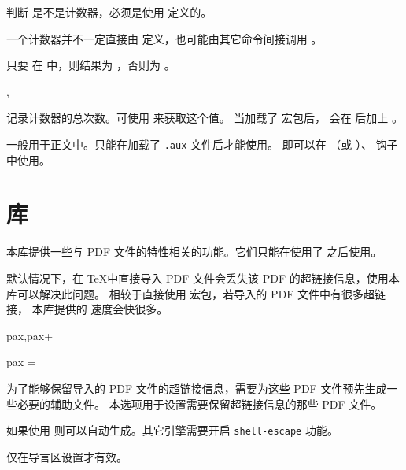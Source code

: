 \documentclass{cusdoc}
\begin{document}
\begin{function}{\IfIsCounterTF}
  \begin{syntax}
    \V\IfIsCounterTF {}  
  \end{syntax}
判断  是不是计数器，必须是使用  定义的。

\begin{texnote}
一个计数器并不一定直接由  定义，也可能由其它命令间接调用 。

只要  在  中，则结果为 ，否则为 。
\end{texnote}
\end{function}

\begin{function}{\RecordTotalCounters,\IfRecordTotalCounterTF}
  \begin{syntax}
    \V\RecordTotalCounters {}
    \V\IfRecordTotalCounterTF {}  
  \end{syntax}
记录计数器的总次数。可使用  来获取这个值。
当加载了  宏包后， 会在  后加上 。

 一般用于正文中。只能在加载了 \texttt{.aux} 文件后才能使用。
即可以在 （或 ）、 钩子中使用。
\end{function}


\section{库}

本库提供一些与 PDF 文件的特性相关的功能。它们只能在使用了 
 之后使用。

默认情况下，在 \TeX 中直接导入 PDF 文件会丢失该 PDF 的超链接信息，使用本库可以解决此问题。
相较于直接使用  宏包，若导入的 PDF 文件中有很多超链接，
本库提供的  速度会快很多。

\begin{keyval}[path=pdf]{pax,pax+}
  \begin{syntax}
    pax = 
  \end{syntax}
为了能够保留导入的 PDF 文件的超链接信息，需要为这些 PDF 文件预先生成一些必要的辅助文件。
本选项用于设置需要保留超链接信息的那些 PDF 文件。

如果使用 \LuaLaTeX 则可以自动生成。其它引擎需要开启 \texttt{shell-escape} 功能。

仅在导言区设置才有效。
\end{keyval}
\end{document}
